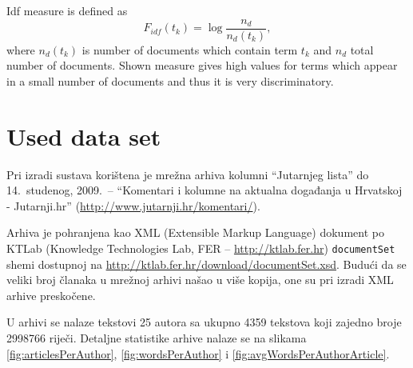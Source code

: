 \documentclass[11pt,english]{article}
\begin{document}
\begin{multicols}{2}
Idf measure is defined as
\begin{equation}
F_{idf}(t_k) = \log \frac{n_d}{n_d(t_k)},
\label{equ:idf}
\end{equation}
where $n_d(t_k)$ is number of documents which contain term $t_k$ and $n_d$
total number of documents. Shown measure gives high values for terms which
appear in a small number of documents and thus it is very discriminatory.


\section{Used data set}
\label{sec:podatci}
Pri izradi sustava korištena je mrežna arhiva kolumni ``Jutarnjeg lista'' do
14.~studenog, 2009.~-- ``Komentari i kolumne na aktualna događanja u
Hrvatskoj - Jutarnji.hr'' (\url{http://www.jutarnji.hr/komentari/}).

Arhiva je pohranjena kao XML (Extensible Markup Language) dokument po KTLab
(Knowledge Technologies Lab, FER -- \url{http://ktlab.fer.hr})
\texttt{documentSet} shemi dostupnoj na
\url{http://ktlab.fer.hr/download/documentSet.xsd}. Budući da se veliki broj
članaka u mrežnoj arhivi našao u više kopija, one su pri izradi XML arhive
preskočene.

U arhivi se nalaze tekstovi 25 autora sa ukupno 4359 tekstova koji zajedno broje
2998766 riječi. Detaljne statistike arhive nalaze se na slikama
\ref{fig:articlesPerAuthor}, \ref{fig:wordsPerAuthor} i
\ref{fig:avgWordsPerAuthorArticle}.


\end{multicols}
\end{document}
